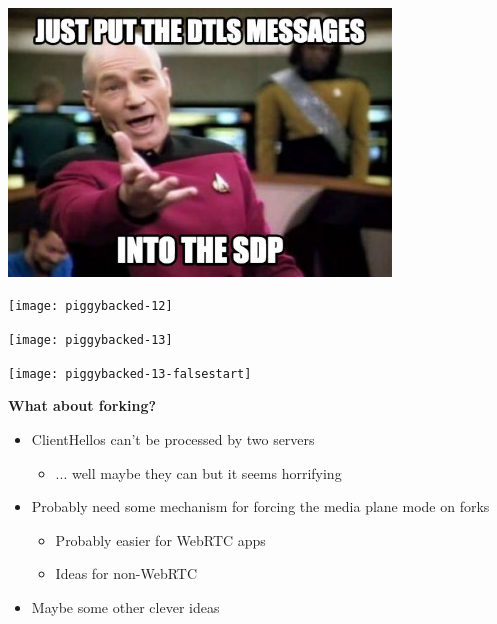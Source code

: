 \documentclass[helvetica]{seminar}
\newcommand{\heading}[1]{%
  \begin{center} 
    \large\bf 
    #1 
  \end{center} 
  \vspace{.4 in}}
\begin{document}
\begin{slide}

\begin{center}
\includegraphics[width=4in]{850871}
\end{center}
\end{slide}


\begin{slide}
\texttt{[image: piggybacked-12]}
\end{slide}

\begin{slide}
\texttt{[image: piggybacked-13]}
\end{slide}

\begin{slide}
\texttt{[image: piggybacked-13-falsestart]}
\end{slide}


\begin{slide}
\heading{What about forking?}

\begin{itemize}
\item ClientHellos can't be processed by two servers
  \begin{itemize}
  \item ... well maybe they can but it seems horrifying
  \end{itemize}
\item Probably need some mechanism for forcing the media plane mode on forks
  \begin{itemize}
  \item Probably easier for WebRTC apps
  \item Ideas for non-WebRTC
  \end{itemize}
\item Maybe some other clever ideas
\end{itemize}
\end{slide}
\end{document}
